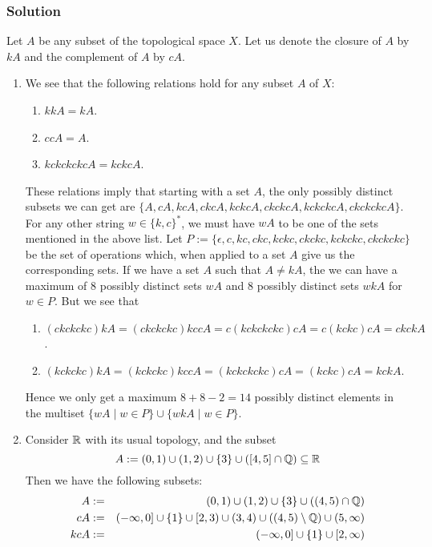 \subsubsection{Solution}
Let $A$ be any subset of the topological space $X$. Let us denote the closure of $A$ by $kA$ and the complement of $A$ by $cA$.
\begin{enumerate}
    \item We see that the following relations hold for any subset $A$ of $X$:
    \begin{enumerate}
        \item $kkA = kA$.
        \item $ccA = A$.
        \item $kckckckcA = kckcA$.
    \end{enumerate}
    These relations imply that starting with a set $A$, the only possibly distinct subsets we can get are $\{A, cA, kcA, ckcA, kckcA, ckckcA, kckckcA, ckckckcA\}$. For any other string $w \in \{k, c\}^*$, we must have $wA$ to be one of the sets mentioned in the above list. Let $P := \{\epsilon, c, kc, ckc, kckc, ckckc, kckckc, ckckckc\}$ be the set of operations which, when applied to a set $A$ give us the corresponding sets.  If we have a set $A$ such that $A \neq kA$, the we can have a maximum of 8 possibly distinct sets $wA$ and 8 possibly distinct sets $wkA$ for $w \in P$. But we see that
    \begin{enumerate}
        \item $(ckckckc)kA = (ckckckc)kccA = c(kckckckc)cA = c(kckc)cA = ckckA$.
        \item $(kckckc)kA = (kckckc)kccA = (kckckckc)cA = (kckc)cA = kckA$.
    \end{enumerate}
    Hence we only get a maximum $8+8-2 = 14$ possibly distinct elements in the multiset $\{wA \mid w \in P\} \cup \{wkA \mid w \in P\}$.
    \item Consider $\mathbb R$ with its usual topology, and the subset
    \[ A := (0, 1) \cup (1, 2) \cup \{3\} \cup \left( [4, 5] \cap \mathbb Q \right) \subseteq \mathbb R \]
    Then we have the following subsets:
    \begin{eqnarray*}
        A & := & (0, 1) \cup (1, 2) \cup \{3\} \cup \left( (4, 5) \cap \Q \right)\\
        cA & := & (-\infty, 0] \cup \{1\} \cup [2, 3) \cup (3, 4) \cup \left( (4, 5) \setminus \Q \right) \cup (5, \infty)\\
        kcA & := & (-\infty, 0] \cup \{1\} \cup [2, \infty)\\

\end{eqnarray*}
\end{enumerate}
